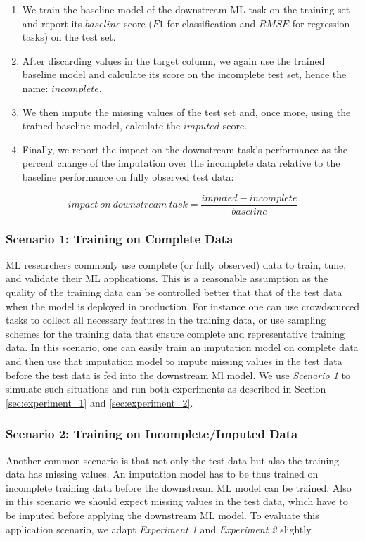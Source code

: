 \begin{enumerate}
\item We train the baseline model of the downstream ML task on the training set and report its $baseline$ score ($F1$ for classification and $RMSE$ for regression tasks) on the test set.
\item After discarding values in the target column, we again use the trained baseline model and calculate its score on the incomplete test set, hence the name: $incomplete$.
\item We then impute the missing values of the test set and, once more, using the trained baseline model, calculate the $imputed$ score.
\item Finally, we report the impact on the downstream task's performance as the percent change of the imputation over the incomplete data relative to the baseline performance on fully observed test data:
\end{enumerate}
%
\begin{equation}
	impact\ on \ downstream\ task = \frac{imputed - incomplete}{baseline}
	\label{eq:impact}
\end{equation}
%



\subsubsection{Scenario 1: Training on Complete Data}
\label{sec:scenario_1}
%
ML researchers commonly use complete (or fully observed) data to train, tune, and validate their ML applications. This is a reasonable assumption as the quality of the training data can be controlled better that that of the test data when the model is deployed in production. For instance one can use crowdsourced tasks to collect all necessary features in the training data, or use sampling schemes for the training data that ensure complete and representative training data. In this scenario, one can easily train an imputation model on complete data and then use that imputation model to impute missing values in the test data before the test data is fed into the downstream Ml model. We use \emph{Scenario 1} to simulate such situations and run both experiments as described in Section \ref{sec:experiment_1} and \ref{sec:experiment_2}.

\subsubsection{Scenario 2: Training on Incomplete/Imputed Data}
\label{sec:scenario_2}
%
Another common scenario is that not only the test data but also the training data has missing values. An imputation model has to be thus trained on incomplete training data before the downstream ML model can be trained. Also in this scenario we should expect missing values in the test data, which have to be imputed before applying the downstream ML model. To evaluate this application scenario, we adapt \emph{Experiment 1} and \emph{Experiment 2} slightly.

